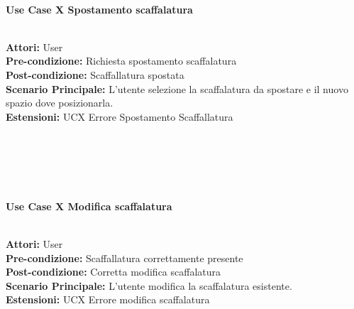 \vspace{0.5cm}

\Large\textbf{}\\
\Large\textbf{Use Case X Spostamento scaffalatura} \\
\vspace{0.5cm}

\large\textbf{} \\
\textbf{Attori:} User\\
\textbf{Pre-condizione:} Richiesta spostamento scaffalatura \\
\textbf{Post-condizione: } Scaffallatura spostata \\
\textbf{Scenario Principale:}  L'utente selezione la scaffalatura da spostare e il nuovo spazio dove posizionarla.\\
\textbf{Estensioni: } UCX Errore Spostamento Scaffallatura\\

\vspace{0.5cm}

\textbf{}\\
{} \\
{}\\

\vspace{0.5cm}

\Large\textbf{}\\
\Large\textbf{Use Case X Modifica scaffalatura} \\
\vspace{0.5cm}

\large\textbf{} \\
\textbf{Attori:} User\\
\textbf{Pre-condizione:} Scaffallatura correttamente presente \\
\textbf{Post-condizione: } Corretta modifica scaffalatura\\
\textbf{Scenario Principale:}  L'utente modifica la scaffalatura esistente. \\
\textbf{Estensioni: } UCX Errore modifica scaffalatura\\

\vspace{0.5cm}

\textbf{}\\
{} \\

\vspace{0.5cm}